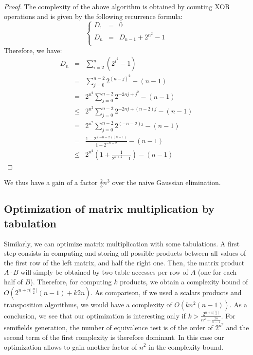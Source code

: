\documentclass{article}\usepackage{amsthm}
\begin{document}
\begin{proof}
The complexity of the above algorithm is obtained by counting XOR operations and is given by the following recurrence formula:  
\begin{equation}
\left \{
\begin{array}{ccc}
    D_1 & = & 0 \\
  	D_n & = & D_{n-1} + 2^{n^2} - 1 \\
\end{array}
\right. 
\end{equation}
Therefore, we have:
$$\begin{array}{ccc}
	D_n  & = & \sum\limits_{i=2}^{n} \left(2^{i^2} -1\right)  \\
	&  = & \sum\limits_{j=0}^{n-2} 2^{(n-j)^2} - (n-1) \\
	& = & 2^{n^2}\sum\limits_{j=0}^{n-2} 2^{-2nj+j^2} - (n-1) \\
	& \le & 2^{n^2}\sum\limits_{j=0}^{n-2} 2^{-2nj+(n-2)j} - (n-1)\\
	& = & 2^{n^2}\sum\limits_{j=0}^{n-2} 2^{(-n-2)j} - (n-1) \\ 
	& = & \frac{1 - 2^{(-n-2)(n-1)}}{1 - 2^{-n-2}} -(n-1)\\
	& \le & 2^{n^2} (1 + \frac{1}{2^{n+2}-1}) - (n-1)
\end{array}$$
\end{proof}
We thus have a gain of a factor $\frac{2}{3}n^3$ over the naive Gaussian
elimination. 









\subsection{Optimization of matrix multiplication by tabulation}



Similarly, we can optimize matrix multiplication with some tabulations. 
A first step consists in computing and storing all
possible products between all values of the first row of the left matrix, and
half the right one. Then, the matrix product $A \cdot B$ will simply  be
obtained by two table accesses per row of $A$ (one for each half of
$B$). Therefore, for computing $k$ products, 
we obtain a complexity bound of $O(2^{n+ n \lceil \frac{n}{2}
  \rceil}(n-1) + k2n) $. 
As comparison, if we used a scalars products and transposition algorithms, we
would have a complexity of $O(kn^2(n-1))$. As a conclusion, we see that our
optimization is interesting only if $k > \frac{2^{n+ n \lceil \frac{n}{2}
  \rceil}}{n^2 + \frac{2n}{n-1}}$. 
For semifields generation, the number of equivalence test is of the order of $2^{n^2}$ and the second term of the first complexity is therefore dominant.
In this case our optimization allows to gain another factor of $n^2$ in the complexity bound. 
\end{document}

